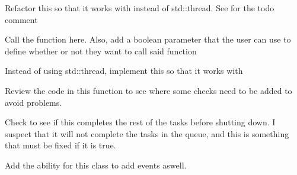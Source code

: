 \begin{DoxyRefList}
\item[Class \doxylink{class_atlas_1_1_game_thread_scheduler}{Atlas\+::Game\+Thread\+Scheduler} ]\label{todo__todo000003}%
%
Refactor this so that it works with  instead of std\+::thread. See  for the todo comment  
\item[Member \doxylink{class_atlas_1_1_game_thread_scheduler_aad5d87a8e7e0f0be677e074fd24f9abc}{Atlas\+::Game\+Thread\+Scheduler\+::Game\+Thread\+Scheduler} (uint8\+\_\+t num\+Threads, bool call\+Init=true)]\label{todo__todo000005}%
%
Call the  function here. Also, add a boolean parameter that the user can use to define whether or not they want to call said function 
\item[Member \doxylink{class_atlas_1_1_game_thread_scheduler_ae98fd862f6d8217c8a5929ef1416f383}{Atlas\+::Game\+Thread\+Scheduler\+::m\+Workers\+Vector} ]\label{todo__todo000004}%
%
Instead of using std\+::thread, implement this so that it works with  
\item[Member \doxylink{class_atlas_1_1_game_thread_scheduler_affbc81ea67fdfb55931e62c695680472}{Atlas\+::Game\+Thread\+Scheduler\+::schedule} (Func \&\&func, Args \&\&... args) -\/\texorpdfstring{$>$}{>} std\+::future\texorpdfstring{$<$}{<} std\+::invoke\+\_\+result\+\_\+t$<$ Func, Args... $>$ \texorpdfstring{$>$}{>}]\label{todo__todo000007}%
%
Review the code in this function to see where some checks need to be added to avoid problems.  
\item[Member \doxylink{class_atlas_1_1_game_thread_scheduler_aaa9fb8b4737765884265529a20601b50}{Atlas\+::Game\+Thread\+Scheduler\+::\texorpdfstring{$\sim$}{\string~}\+Game\+Thread\+Scheduler} ()]\label{todo__todo000006}%
%
Check to see if this completes the rest of the tasks before shutting down. I suspect that it will not complete the tasks in the queue, and this is something that must be fixed if it is true. 
\item[Class \doxylink{class_atlas_1_1_scripted_object}{Atlas\+::Scripted\+Object} ]\label{todo__todo000016}%
%
Add the ability for this class to add events aswell.  
\item[Member \doxylink{class_atlas_1_1_scripted_object_a9ffc63eb4b8326d5e49ecdb59f3a943d}{Atlas\+::Scripted\+Object\+::expose\+Scripting\+Symbols} ()]\label{todo__todo000017}%

\end{DoxyRefList}
